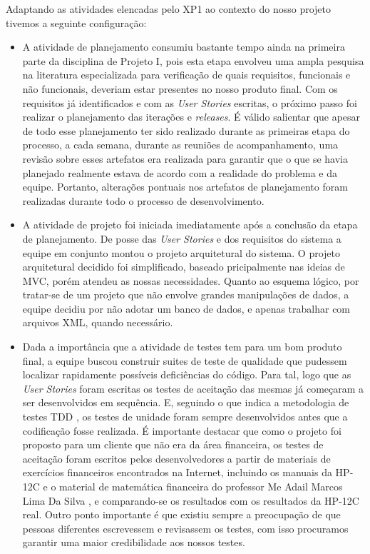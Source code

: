 Adaptando as atividades elencadas pelo XP1 ao contexto do nosso projeto tivemos a seguinte configuração: 
\begin{itemize}
 \item  A atividade de planejamento consumiu bastante tempo ainda na primeira parte da disciplina de Projeto I, pois esta etapa envolveu uma ampla pesquisa na literatura especializada para verificação de quais requisitos, funcionais e não funcionais, deveriam estar presentes no nosso produto final. Com os requisitos já identificados e com as \textit{User Stories} escritas, o próximo passo foi realizar o planejamento das iterações e \textit{releases}. É válido salientar que apesar de todo esse planejamento ter sido realizado durante as primeiras etapa do processo, a cada semana, durante as reuniões de acompanhamento, uma revisão sobre esses artefatos era realizada para garantir que o que se havia planejado realmente estava de acordo com a realidade do problema e da equipe. Portanto, alterações pontuais nos artefatos de planejamento foram realizadas durante todo o processo de desenvolvimento.
 \item A atividade de projeto foi iniciada imediatamente após a conclusão da etapa de planejamento. De posse das \textit{User Stories} e dos requisitos do sistema a equipe em conjunto montou o projeto arquitetural do sistema. O projeto arquitetural decidido foi simplificado, baseado pricipalmente nas ideias de MVC, porém atendeu as nossas necessidades. Quanto ao esquema lógico, por tratar-se de um projeto que não envolve grandes manipulações de dados, a equipe decidiu por não adotar um banco de dados, e apenas trabalhar com arquivos XML, quando necessário.
 \item Dada a importância que a atividade de testes tem para um bom produto final, a equipe buscou construir suites de teste de qualidade que pudessem localizar rapidamente possíveis deficiências do código. Para tal, logo que as \textit{User Stories} foram escritas os testes de aceitação das mesmas já começaram a ser desenvolvidos em sequência. E, seguindo o que indica a metodologia de testes TDD \cite{TDD}, os testes de unidade foram sempre desenvolvidos antes que a codificação fosse realizada. É importante destacar que como o projeto foi proposto para um cliente que não era da área financeira, os testes de aceitação foram escritos pelos desenvolvedores a partir de materiais de exercícios financeiros encontrados na Internet, incluindo os manuais da HP-12C \cite{man1} \cite{man2} \cite{man3} \cite{man4} e o material de matemática financeira do professor Me Adail Marcos Lima Da Silva \cite{adail}, e comparando-se os resultados com os resultados da HP-12C real. Outro ponto importante é que existiu sempre a preocupação de que pessoas diferentes escrevessem e revisassem os testes, com isso procuramos garantir uma maior credibilidade aos nossos testes. 

\end{itemize}
